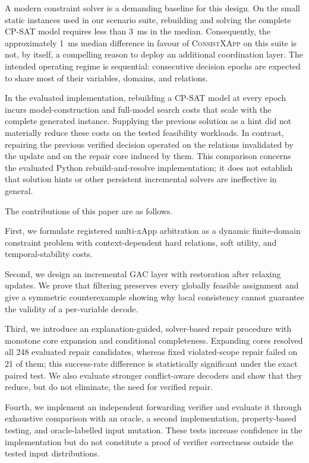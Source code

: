 \documentclass[pdflatex,sn-mathphys-num,iicol,oneside]{sn-jnl}
\newcommand{\method}{\textsc{ConsistXApp}\xspace}
\newcommand{\gac}{\textsc{GAC}\xspace}
\newcommand{\cpsat}{\textsc{CP-SAT}\xspace}
\begin{document}
A modern constraint solver is a demanding baseline for this design.
On the small static instances used in our scenario suite, rebuilding
and solving the complete \cpsat model requires less than 3~ms in the
median. Consequently, the approximately 1~ms median difference in
favour of \method on this suite is not, by itself, a compelling reason
to deploy an additional coordination layer. The intended operating
regime is sequential: consecutive decision epochs are expected to
share most of their variables, domains, and relations.

In the evaluated implementation, rebuilding a \cpsat model at every
epoch incurs model-construction and full-model search costs that scale
with the complete generated instance. Supplying the previous solution
as a hint did not materially reduce these costs on the tested
feasibility workloads. In contrast, repairing the previous verified
decision operated on the relations invalidated by the update and on
the repair core induced by them. This comparison concerns the
evaluated Python rebuild-and-resolve implementation; it does not
establish that solution hints or other persistent incremental solvers
are ineffective in general.

The contributions of this paper are as follows.

First, we formulate registered multi-xApp arbitration as a dynamic
finite-domain constraint problem with context-dependent hard
relations, soft utility, and temporal-stability costs.

Second, we design an incremental \gac layer with restoration after
relaxing updates. We prove that filtering preserves every globally
feasible assignment and give a symmetric counterexample showing why
local consistency cannot guarantee the validity of a per-variable
decode.

Third, we introduce an explanation-guided, solver-based repair
procedure with monotone core expansion and conditional completeness.
Expanding cores resolved all 248 evaluated repair candidates, whereas fixed violated-scope repair failed on 21 of them; this success-rate difference is statistically significant under the exact paired test. We also evaluate
stronger conflict-aware decoders and show that they reduce, but do not
eliminate, the need for verified repair.

Fourth, we implement an independent forwarding verifier and evaluate
it through exhaustive comparison with an oracle, a second
implementation, property-based testing, and oracle-labelled input
mutation. These tests increase confidence in the implementation but
do not constitute a proof of verifier correctness outside the tested
input distributions.
\end{document}
